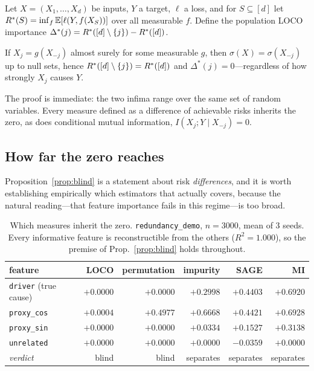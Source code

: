 Let $X = (X_1,\dots,X_d)$ be inputs, $Y$ a target, $\ell$ a loss, and for
$S \subseteq [d]$ let $R^*(S) = \inf_f \mathbb{E}[\ell(Y, f(X_S))]$ over all
measurable $f$. Define the population LOCO importance
$\Delta^*(j) = R^*([d]\setminus\{j\}) - R^*([d])$.

\begin{proposition}[Blindness]\label{prop:blind}
If $X_j = g(X_{-j})$ almost surely for some measurable $g$, then
$\sigma(X) = \sigma(X_{-j})$ up to null sets, hence
$R^*([d]\setminus\{j\}) = R^*([d])$ and $\Delta^*(j) = 0$---regardless
of how strongly $X_j$ causes $Y$.
\end{proposition}

The proof is immediate: the two infima range over the same set of random
variables. Every measure defined as a difference of achievable risks inherits
the zero, as does conditional mutual information, $I(X_j;Y \mid X_{-j}) = 0$.

\subsection{How far the zero reaches}\label{sec:scope}

Proposition~\ref{prop:blind} is a statement about risk \emph{differences}, and
it is worth establishing empirically which estimators that actually covers,
because the natural reading---that feature importance fails in this
regime---is too broad.

\begin{table}[t]\centering\small
\caption{Which measures inherit the zero. \texttt{redundancy\_demo}, $n=3000$,
mean of 3 seeds. Every informative feature is reconstructible from the others
($R^2 = 1.000$), so the premise of Prop.~\ref{prop:blind} holds throughout.}
\label{tab:scope}
\begin{tabular}{lrrrrr}
\toprule
feature & LOCO & permutation & impurity & SAGE & MI \\
\midrule
\texttt{driver} (true cause) & $\mathbf{+0.0000}$ & $\mathbf{+0.0000}$ & $+0.2998$ & $+0.4403$ & $+0.6920$ \\
\texttt{proxy\_cos}          & $+0.0004$ & $+0.4977$ & $+0.6668$ & $+0.4421$ & $+0.6928$ \\
\texttt{proxy\_sin}          & $\mathbf{+0.0000}$ & $\mathbf{+0.0000}$ & $+0.0334$ & $+0.1527$ & $+0.3138$ \\
\texttt{unrelated}           & $+0.0000$ & $+0.0000$ & $+0.0000$ & $-0.0359$ & $+0.0000$ \\
\midrule
\multicolumn{1}{l}{\emph{verdict}} & blind & blind & separates & separates & separates \\
\bottomrule
\end{tabular}
\end{table}

